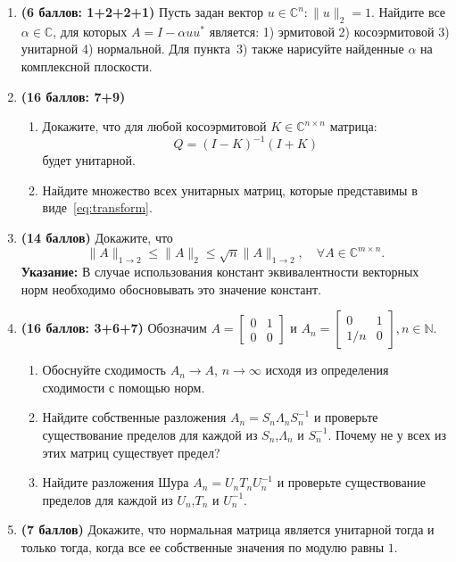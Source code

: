 \documentclass{article}
\begin{document}
\begin{enumerate}
    \item \textbf{(6 баллов: 1+2+2+1)} Пусть задан вектор $u\in\mathbb{C}^n\colon \|u\|_2=1$. Найдите все $\alpha \in \mathbb{C}$, для которых $A = I - \alpha u u^*$ является: 1) эрмитовой 2) косоэрмитовой 3) унитарной 4) нормальной. Для пункта~{3)} также нарисуйте найденные $\alpha$ на комплексной плоскости.
    \item \textbf{(16 баллов: 7+9)}
    \begin{enumerate}
        \item
    Докажите, что для любой косоэрмитовой $K\in\mathbb{C}^{n\times n}$ матрица:
    \begin{equation} \label{eq:transform}
        Q = (I - K)^{-1} (I+K)
    \end{equation}
    будет унитарной. 
    \item Найдите множество всех унитарных матриц, которые представимы в виде~\eqref{eq:transform}.
        \end{enumerate}
    \item \textbf{(14 баллов)}
        Докажите, что
    \[
       \|A\|_{1\to 2} \leq  \|A\|_{2} \leq \sqrt{n} \|A\|_{1\to 2
    }, \quad \forall A\in\mathbb{C}^{m\times n}.
    \] 
    \textbf{Указание:} В случае использования констант эквивалентности векторных норм необходимо обосновывать это значение констант. 
   \item \textbf{(16 баллов: 3+6+7)}
   Обозначим $A = \begin{bmatrix}0 & 1 \\ 0 & 0 \end{bmatrix}$ и $A_n = \begin{bmatrix} 0 & 1 \\ 1/n & 0 \end{bmatrix}, n\in\mathbb{N}$.
   \begin{enumerate}
       \item Обоснуйте сходимость $A_n\to A$, $n\to\infty$ исходя из определения сходимости с помощью норм.
       \item Найдите собственные разложения $A_n = S_n \Lambda_n S_n^{-1}$ и проверьте существование пределов для каждой из $S_n$,$\Lambda_n$ и $S_n^{-1}$. Почему не у всех из этих матриц существует предел?
       \item Найдите разложения Шура $A_n = U_n T_n U_n^{-1}$ и проверьте существование пределов для каждой из $U_n$,$T_n$ и $U_n^{-1}$.
   \end{enumerate}
    \item \textbf{(7 баллов)} Докажите, что нормальная матрица является унитарной тогда и только тогда, когда все ее собственные значения по модулю равны $1$.

\end{enumerate}
\end{document}
